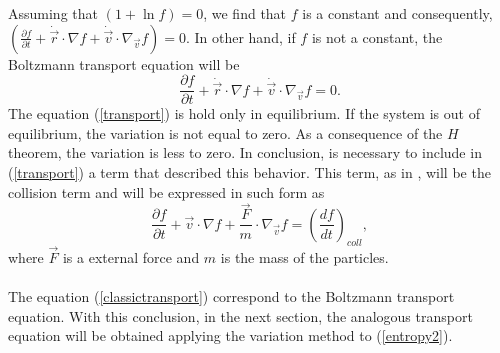 \documentclass{article}
\begin{document}
Assuming that $(1+\ln f)=0$, we find that $f$ is a constant and consequently, $(\frac{\partial f}{\partial t}+\dot{\vec{r}}\cdot \nabla f+\dot{\vec{v}}\cdot \nabla_{\vec{v}} f)=0$. In other hand, if $f$ is not a constant, the Boltzmann transport equation will be
\begin{equation}
    \frac{\partial f}{\partial t}+\dot{\vec{r}}\cdot \nabla f+\dot{\vec{v}}\cdot \nabla_{\vec{v}} f=0.\label{transport}
\end{equation}
The equation (\ref{transport}) is hold only in equilibrium. If the system is out of equilibrium, the variation is not equal to zero. As a consequence of the $H$ theorem, the variation is less to zero. In conclusion, is necessary to include in (\ref{transport}) a term that described this behavior. This term, as in \cite{huang}, will be the collision term and will be expressed in such form as
\begin{equation}
    \frac{\partial f}{\partial t}+\vec{v}\cdot \nabla f+\frac{\vec{F}}{m}\cdot \nabla_{\vec{v}} f=\left( \frac{df}{dt} \right)_{coll}, \label{classictransport}
\end{equation}
where $\vec{F}$ is a external force and $m$ is the mass of the particles.\\
\\
The equation (\ref{classictransport}) correspond to the Boltzmann transport equation. With this conclusion, in the next section, the analogous transport equation will be obtained applying the variation method to (\ref{entropy2}).
\end{document}
